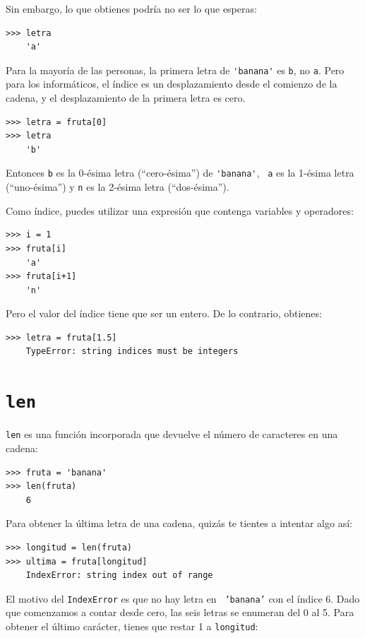 \documentclass[10pt]{book}
\begin{document}
Sin embargo, lo que obtienes podría no ser lo que esperas:

\begin{verbatim}
>>> letra
    'a'
\end{verbatim}
%
Para la mayoría de las personas, la primera letra de \verb"'banana'" es {\tt b}, no
{\tt a}.  Pero para los informáticos, el índice es un desplazamiento desde el
comienzo de la cadena, y el desplazamiento de la primera letra es cero.

\begin{verbatim}
>>> letra = fruta[0]
>>> letra
    'b'
\end{verbatim}
%
Entonces {\tt b} es la 0-ésima letra  (``cero-ésima'') de \verb"'banana'", {\tt
  a} es la 1-ésima letra (``uno-ésima'') y {\tt n} es la 2-ésima letra
(``dos-ésima'').   

Como índice, puedes utilizar una expresión que contenga variables y
operadores:

\begin{verbatim}
>>> i = 1
>>> fruta[i]
    'a'
>>> fruta[i+1]
    'n'
\end{verbatim}
%

Pero el valor del índice tiene que ser un entero.  De lo contrario,
obtienes:

\begin{verbatim}
>>> letra = fruta[1.5]
    TypeError: string indices must be integers
\end{verbatim}
%

\section{{\tt len}}

{\tt len} es una función incorporada que devuelve el número de caracteres
en una cadena:

\begin{verbatim}
>>> fruta = 'banana'
>>> len(fruta)
    6
\end{verbatim}
%
Para obtener la última letra de una cadena, quizás te tientes a intentar algo
así:

\begin{verbatim}
>>> longitud = len(fruta)
>>> ultima = fruta[longitud]
    IndexError: string index out of range
\end{verbatim}
%
El motivo del {\tt IndexError} es que no hay letra en {\tt
'banana'} con el índice 6.  Dado que comenzamos a contar desde cero, las
seis letras se enumeran del 0 al 5.  Para obtener el último carácter, tienes
que restar 1 a {\tt longitud}:
\end{document}
